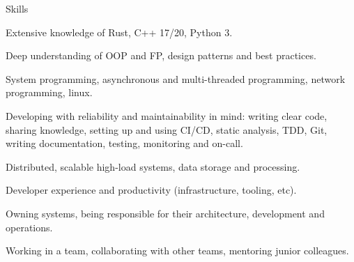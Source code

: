 \documentclass{resume}
\begin{document}
    
    

    \begin{rSection}{Skills}
        \begin{rSubsection}{}{}{}{}
            \item
                Extensive knowledge of
                Rust,
                C++ 17/20,
                Python 3.
            \item
                Deep understanding of OOP and FP, design patterns and best practices.
            \item
                System programming,
                asynchronous and multi-threaded programming,
                network programming,
                linux.
            \item
                Developing with reliability and maintainability in mind:
                writing clear code, sharing knowledge,
                setting up and using CI/CD, static analysis, TDD, Git,
                writing documentation, testing, monitoring and on-call.
        \end{rSubsection}
        \begin{rSubsection}{}{}{}{}
            \item
                Distributed, scalable high-load systems,
                data storage and processing. %
            \item
                Developer experience and productivity
                (infrastructure, tooling, etc).
        \end{rSubsection}
        \begin{rSubsection}{}{}{}{}
            \item
                Owning systems,
                being responsible for their architecture, development and operations.
            \item
                Working in a team,
                collaborating with other teams,
                mentoring junior colleagues.
        \end{rSubsection}
    \end{rSection}
\end{document}
